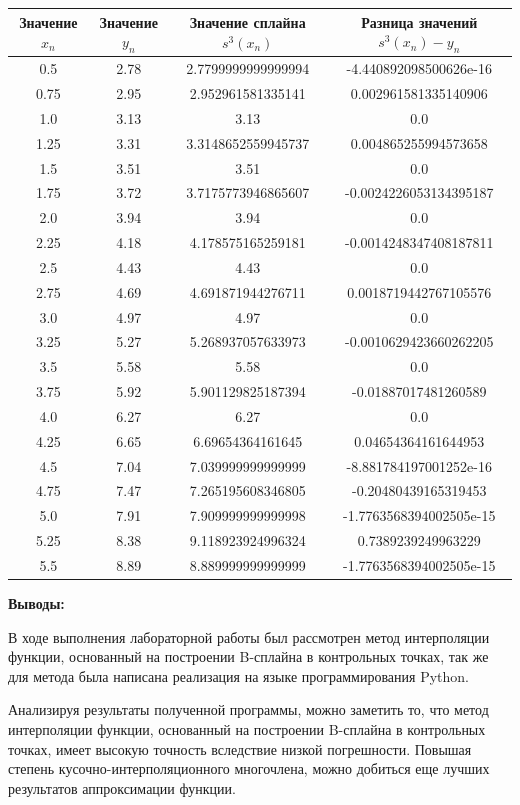 \documentclass [12pt]{article}
\begin{document}
\begin{center}
\begin{tabular}{ |c|c|c|c| }
  \hline
 Значение $x_{n}$ & Значение $y_{n}$ & Значение сплайна $s^{3}(x_n)$ & Разница значений  $s^{3}(x_n)-y_{n}$ \\ \hline
 0.5 & 2.78 & 2.7799999999999994 & -4.440892098500626e-16\\ \hline
 0.75 & 2.95 & 2.952961581335141 & 0.002961581335140906\\ \hline
 1.0 & 3.13 & 3.13 & 0.0\\ \hline
 1.25 & 3.31 & 3.3148652559945737 & 0.004865255994573658\\ \hline
 1.5 & 3.51 & 3.51 & 0.0\\ \hline
 1.75 & 3.72 & 3.7175773946865607 & -0.0024226053134395187\\ \hline
 2.0 & 3.94 & 3.94 & 0.0\\ \hline
 2.25 & 4.18 & 4.178575165259181 & -0.0014248347408187811\\ \hline
 2.5 & 4.43 & 4.43 & 0.0\\ \hline
 2.75 & 4.69 & 4.691871944276711 & 0.0018719442767105576\\ \hline
 3.0 & 4.97 & 4.97 & 0.0\\ \hline
 3.25 & 5.27 & 5.268937057633973 & -0.0010629423660262205\\ \hline
 3.5 & 5.58 & 5.58 & 0.0\\ \hline
 3.75 & 5.92 & 5.901129825187394 & -0.01887017481260589\\ \hline
 4.0 & 6.27 & 6.27 & 0.0\\ \hline
 4.25 & 6.65 & 6.69654364161645 & 0.04654364161644953\\ \hline
 4.5 & 7.04 & 7.039999999999999 & -8.881784197001252e-16\\ \hline
 4.75 & 7.47 & 7.265195608346805 & -0.20480439165319453\\ \hline
 5.0 & 7.91 & 7.909999999999998 & -1.7763568394002505e-15\\ \hline
 5.25 & 8.38 & 9.118923924996324 & 0.7389239249963229\\ \hline
 5.5 & 8.89 & 8.889999999999999 & -1.7763568394002505e-15\\ \hline
\end{tabular}
\end{center}

\textbf{Выводы:}

В ходе выполнения лабораторной работы был рассмотрен метод интерполяции функции, основанный на построении B-сплайна в контрольных точках, так же для метода была написана реализация на языке программирования Python.

Анализируя результаты полученной программы, можно заметить то, что метод интерполяции функции, основанный на построении B-сплайна в контрольных точках, имеет высокую точность вследствие низкой погрешности. Повышая степень кусочно-интерполяционного многочлена, можно добиться еще лучших результатов аппроксимации функции.
\end{document}
